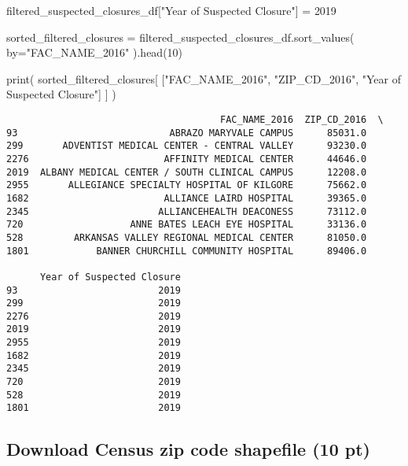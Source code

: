 \documentclass[
  letterpaper,
  DIV=11,
  numbers=noendperiod]{scrartcl}
\newenvironment{Shaded}{\begin{snugshade}}{\end{snugshade}}
\newcommand{\BuiltInTok}[1]{\textcolor[rgb]{0.00,0.23,0.31}{#1}}
\newcommand{\DecValTok}[1]{\textcolor[rgb]{0.68,0.00,0.00}{#1}}
\newcommand{\NormalTok}[1]{\textcolor[rgb]{0.00,0.23,0.31}{#1}}
\newcommand{\OperatorTok}[1]{\textcolor[rgb]{0.37,0.37,0.37}{#1}}
\newcommand{\StringTok}[1]{\textcolor[rgb]{0.13,0.47,0.30}{#1}}
\begin{document}
\begin{Shaded}
\begin{Highlighting}[]
\NormalTok{filtered\_suspected\_closures\_df[}\StringTok{"Year of Suspected Closure"}\NormalTok{] }\OperatorTok{=} \DecValTok{2019}

\NormalTok{sorted\_filtered\_closures }\OperatorTok{=}\NormalTok{ filtered\_suspected\_closures\_df.sort\_values(}
\NormalTok{    by}\OperatorTok{=}\StringTok{"FAC\_NAME\_2016"}
\NormalTok{).head(}\DecValTok{10}\NormalTok{)}

\BuiltInTok{print}\NormalTok{(}
\NormalTok{    sorted\_filtered\_closures[}
\NormalTok{        [}\StringTok{"FAC\_NAME\_2016"}\NormalTok{, }\StringTok{"ZIP\_CD\_2016"}\NormalTok{, }\StringTok{"Year of Suspected Closure"}\NormalTok{]}
\NormalTok{    ]}
\NormalTok{)}
\end{Highlighting}
\end{Shaded}

\begin{verbatim}
                                      FAC_NAME_2016  ZIP_CD_2016  \
93                           ABRAZO MARYVALE CAMPUS      85031.0   
299       ADVENTIST MEDICAL CENTER - CENTRAL VALLEY      93230.0   
2276                        AFFINITY MEDICAL CENTER      44646.0   
2019  ALBANY MEDICAL CENTER / SOUTH CLINICAL CAMPUS      12208.0   
2955       ALLEGIANCE SPECIALTY HOSPITAL OF KILGORE      75662.0   
1682                        ALLIANCE LAIRD HOSPITAL      39365.0   
2345                       ALLIANCEHEALTH DEACONESS      73112.0   
720                   ANNE BATES LEACH EYE HOSPITAL      33136.0   
528         ARKANSAS VALLEY REGIONAL MEDICAL CENTER      81050.0   
1801            BANNER CHURCHILL COMMUNITY HOSPITAL      89406.0   

      Year of Suspected Closure  
93                         2019  
299                        2019  
2276                       2019  
2019                       2019  
2955                       2019  
1682                       2019  
2345                       2019  
720                        2019  
528                        2019  
1801                       2019  
\end{verbatim}

\subsection{Download Census zip code shapefile (10
pt)}\label{download-census-zip-code-shapefile-10-pt}
\end{document}
